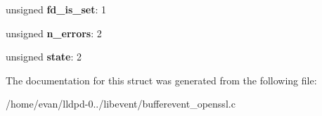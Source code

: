 \begin{DoxyCompactItemize}
\item 
unsigned {\bfseries fd\-\_\-is\-\_\-set}\-: 1\label{structbufferevent__openssl_af189e6fa2752f4742bd43cb22c621392}

\item 
unsigned {\bfseries n\-\_\-errors}\-: 2\label{structbufferevent__openssl_a416d18fbcc72a7a5aace0edb747e03ea}

\item 
unsigned {\bfseries state}\-: 2\label{structbufferevent__openssl_a2ae520db1099ff9c7da192764d4e4790}

\end{DoxyCompactItemize}


\-The documentation for this struct was generated from the following file\-:\begin{DoxyCompactItemize}
\item 
/home/evan/lldpd-\/0../libevent/bufferevent\-\_\-openssl.\-c\end{DoxyCompactItemize}
